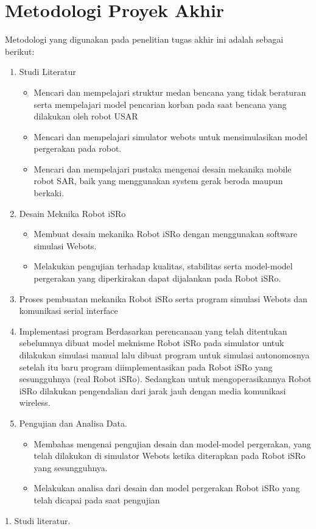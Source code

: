 \section{Metodologi Proyek Akhir}  %
Metodologi yang digunakan pada penelitian tugas akhir ini adalah sebagai berikut:
\begin{enumerate}
 \item Studi Literatur
 \begin{itemize}
    \item Mencari dan mempelajari struktur medan bencana yang tidak beraturan serta mempelajari model pencarian korban pada saat bencana yang dilakukan oleh robot USAR
    \item Mencari dan mempelajari simulator webots untuk mensimulasikan model pergerakan pada robot.
    \item Mencari dan mempelajari pustaka mengenai desain mekanika mobile robot SAR, baik yang menggunakan system gerak beroda maupun berkaki.
 \end{itemize}
 \item Desain Meknika Robot iSRo
 \begin{itemize}
    \item Membuat desain mekanika Robot iSRo dengan menggunakan software simulasi Webots.
    \item Melakukan pengujian terhadap kualitas, stabilitas serta model-model pergerakan yang diperkirakan dapat dijalankan pada Robot iSRo.
 \end{itemize}
 \item Proses pembuatan mekanika Robot iSRo serta program simulasi Webots dan komunikasi serial interface
 \item Implementasi program 
 Berdasarkan perencanaan yang telah ditentukan sebelumnya dibuat model meknisme Robot iSRo pada simulator untuk dilakukan simulasi manual lalu dibuat program untuk simulasi autonomosnya setelah itu baru program diimplementasikan pada Robot iSRo yang sesungguhnya (real Robot iSRo). Sedangkan untuk mengoperasikannya Robot iSRo dilakukan pengendalian dari jarak jauh dengan media komunikasi wireless.
 \item Pengujian dan Analisa Data.
 \begin{itemize}
    \item Membahas mengenai pengujian desain dan model-model pergerakan, yang telah dilakukan di simulator Webots ketika diterapkan pada Robot iSRo yang sesungguhnya. 
    \item Melakukan analisa dari desain dan model pergerakan Robot iSRo yang telah dicapai pada saat pengujian
 \end{itemize}
\end{enumerate}
1. Studi literatur.


